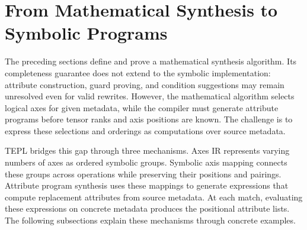 \section{From Mathematical Synthesis to Symbolic Programs}
\label{sec:method}
The preceding sections define and prove a mathematical synthesis algorithm.
Its completeness guarantee does not extend to the symbolic implementation:
attribute construction, guard proving, and condition suggestions may remain
unresolved even for valid rewrites.
However, the mathematical algorithm selects logical axes for given
metadata, while the compiler must generate attribute programs before
tensor ranks and axis positions are known. The challenge is to express
these selections and orderings as computations over source metadata.

TEPL bridges this gap through three mechanisms. Axes IR represents varying
numbers of axes as ordered symbolic groups. Symbolic axis mapping connects
these groups across operations while preserving their positions and pairings.
Attribute program synthesis uses these mappings to generate expressions
that compute replacement attributes from source metadata.
At each match, evaluating these expressions on concrete metadata produces
the positional attribute lists.
The following subsections explain these mechanisms through concrete examples.



